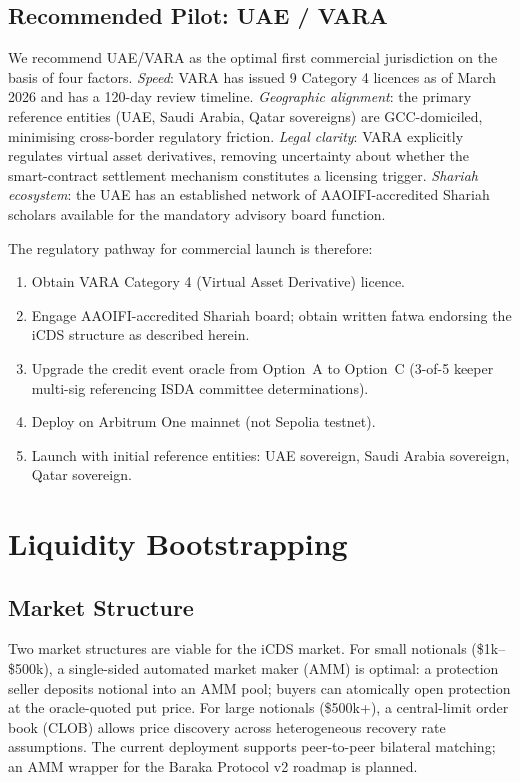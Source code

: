 \documentclass[12pt]{article}
\theoremstyle{plain}
\theoremstyle{definition}
\theoremstyle{remark}
\begin{document}
\subsection{Recommended Pilot: UAE / VARA}

We recommend UAE/VARA as the optimal first commercial jurisdiction on the
basis of four factors.
\emph{Speed}: VARA has issued 9 Category 4 licences as of March 2026 and
has a 120-day review timeline.
\emph{Geographic alignment}: the primary reference entities (UAE, Saudi Arabia,
Qatar sovereigns) are GCC-domiciled, minimising cross-border regulatory friction.
\emph{Legal clarity}: VARA explicitly regulates virtual asset derivatives,
removing uncertainty about whether the smart-contract settlement mechanism
constitutes a licensing trigger.
\emph{Shariah ecosystem}: the UAE has an established network of AAOIFI-accredited
Shariah scholars available for the mandatory advisory board function.

The regulatory pathway for commercial launch is therefore:
\begin{enumerate}[noitemsep]
  \item Obtain VARA Category 4 (Virtual Asset Derivative) licence.
  \item Engage AAOIFI-accredited Shariah board; obtain written fatwa endorsing
    the iCDS structure as described herein.
  \item Upgrade the credit event oracle from Option~A to Option~C
    (3-of-5 keeper multi-sig referencing ISDA committee determinations).
  \item Deploy on Arbitrum One mainnet (not Sepolia testnet).
  \item Launch with initial reference entities: UAE sovereign, Saudi Arabia
    sovereign, Qatar sovereign.
\end{enumerate}

\section{Liquidity Bootstrapping}
\label{sec:liquidity}

\subsection{Market Structure}

Two market structures are viable for the iCDS market.
For small notionals (\$1k--\$500k), a single-sided automated market maker
(AMM) is optimal: a protection seller deposits notional into an AMM pool;
buyers can atomically open protection at the oracle-quoted put price.
For large notionals (\$500k+), a central-limit order book (CLOB) allows
price discovery across heterogeneous recovery rate assumptions.
The current deployment supports peer-to-peer bilateral matching; an AMM
wrapper for the Baraka Protocol v2 roadmap is planned.
\end{document}
